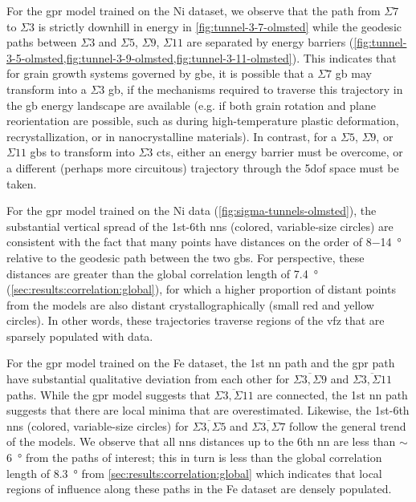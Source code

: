 \documentclass[final,twocolumn,12pt]{elsarticle}
\begin{document}
     For the \gls{gpr} model trained on the Ni \citet{olmstedSurveyComputedGrain2009} dataset, we observe that the path from $\Sigma7$ to $\Sigma3$ is strictly downhill in energy in \cref{fig:tunnel-3-7-olmsted} while the geodesic paths between $\Sigma3$ and $\Sigma5$, $\Sigma9$, $\Sigma11$ are separated by energy barriers (\cref{fig:tunnel-3-5-olmsted,fig:tunnel-3-9-olmsted,fig:tunnel-3-11-olmsted}). This indicates that for grain growth systems governed by \gls{gbe}, it is possible that a $\Sigma7$ \gls{gb} may transform into a $\Sigma3$ \gls{gb}, if the mechanisms required to traverse this trajectory in the \gls{gb} energy landscape are available (e.g. if both grain rotation and plane reorientation are possible, such as during high-temperature plastic deformation, recrystallization, or in nanocrystalline materials). In contrast, for a $\Sigma5$, $\Sigma9$, or $\Sigma11$ \glspl{gb} to transform into $\Sigma3$ \glspl{ct}, either an energy barrier must be overcome, or a different (perhaps more circuitous) trajectory through the \gls{5dof} space must be taken.
     
     For the \gls{gpr} model trained on the Ni data (\cref{fig:sigma-tunnels-olmsted}), the substantial vertical spread of the 1st-6th \glspl{nn} (colored, variable-size circles) are consistent with the fact that many points have distances on the order of \num{8}$-$\SI{14}{\degree} relative to the geodesic path between the two \glspl{gb}. For perspective, these distances are greater than the global correlation length of \SI{7.4}{\degree} (\cref{sec:results:correlation:global}), for which a higher proportion of distant points from the models are also distant crystallographically (small red and yellow circles). In other words, these trajectories traverse regions of the \gls{vfz} that are sparsely populated with data.
     
     For the \gls{gpr} model trained on the Fe \citet{kimPhasefieldModeling3D2014} dataset, the 1st \gls{nn} path and the \gls{gpr} path have substantial qualitative deviation from each other for $\overline{\Sigma3,\Sigma9}$ and $\overline{\Sigma3,\Sigma11}$ paths. While the \gls{gpr} model suggests that $\overline{\Sigma3,\Sigma11}$ are connected, the 1st \gls{nn} path suggests that there are local minima that are overestimated. Likewise, the 1st-6th \glspl{nn} (colored, variable-size circles) for $\overline{\Sigma3,\Sigma5}$ and $\overline{\Sigma3,\Sigma7}$ follow the general trend of the models. We observe that all \glspl{nn} distances up to the 6th \gls{nn} are less than $\sim$\SI{6}{\degree} from the paths of interest; this in turn is less than the global correlation length of \SI{8.3}{\degree} from \cref{sec:results:correlation:global} which indicates that local regions of influence along these paths in the Fe dataset are densely populated.
     
\end{document}
